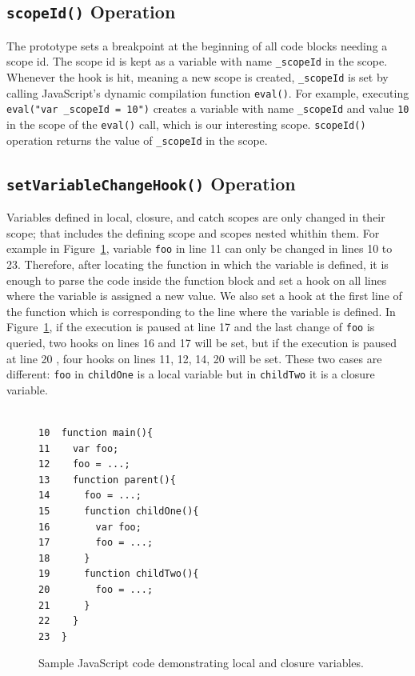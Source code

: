 \documentclass{sig-alternate}
\begin{document}
\subsection{{\normalsize\bf\texttt{scopeId()}} Operation}
The prototype sets a breakpoint at the beginning of all code blocks needing
a scope id. The scope id is kept as a variable with name 
\texttt{\_scopeId} in the scope. Whenever the hook is hit,  meaning a new scope
is created, \texttt{\_scopeId} is set by calling JavaScript's dynamic compilation 
function \texttt{eval()}. For example, executing \texttt{eval("var \_scopeId = 10")} creates a
variable with name \texttt{\_scopeId} and value \texttt{10} in the
scope of the \texttt{eval()} call, which is our interesting scope. \texttt{scopeId()}
operation returns the value of \texttt{\_scopeId} in the scope.

\subsection{{\normalsize\bf\texttt{setVariableChangeHook()}} Operation}
Variables defined in local, closure, and catch scopes are only changed in
their scope; that includes the defining scope and scopes nested whithin them.
For example in Figure~\ref{fig:js-closure}, variable \texttt{foo} in line 11 can only be
changed in lines 10 to 23. Therefore, after locating the function in
which the variable is defined, it is enough to parse the code inside
the function block and set a hook on all lines where the variable is
assigned a new value. 
We also set a hook at the first line of the function which is
corresponding to the line where the variable is defined. In Figure~\ref{fig:js-closure}, 
if the execution is paused at line 17 and the
last change of \texttt{foo} is queried, two hooks on lines 16 and 17
will be set, but if the execution is paused at line 20 , four hooks on
lines 11, 12, 14, 20 will be set. These two cases are different: \texttt{foo} in 
\texttt{childOne} is a local variable
but in \texttt{childTwo} it is a closure variable.

\begin{figure}[htp]
\lstset{basicstyle=\scriptsize}
\begin{lstlisting}[frame=single, language=myLang]%, framerule=0pt]

10  function main(){
11    var foo;
12    foo = ...;
13    function parent(){
14      foo = ...;
15      function childOne(){
16        var foo;
17        foo = ...;
18      }  
19      function childTwo(){
20        foo = ...;			      
21      }
22    }  
23  }    
\end{lstlisting}
\caption{Sample JavaScript code demonstrating local and closure variables.}
\label{fig:js-closure}
\end{figure}
\end{document}
